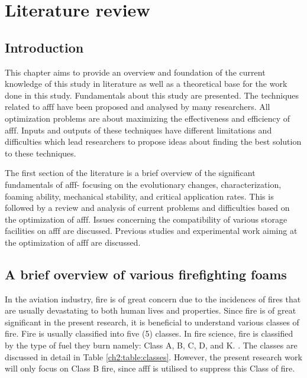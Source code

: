 \chapter{Literature review}
\section{Introduction}
This chapter aims to provide an overview and foundation of the current knowledge of this study in literature as well as a theoretical base for the work done in this study. Fundamentals about this study are presented. The techniques related to \acrshort{afff} have been proposed and analysed by many researchers. All optimization problems are about maximizing the effectiveness and efficiency of \acrshort{afff}. Inputs and outputs of these techniques have different limitations and difficulties which lead researchers to propose ideas about finding the best solution to these techniques.  

The first section of the literature is a brief overview of the significant fundamentals of \acrshort{afff}- focusing on the evolutionary changes, characterization, foaming ability, mechanical stability, and critical application rates. This is followed by a review and analysis of current problems and difficulties based on the optimization of \acrshort{afff}. Issues concerning the compatibility of various storage facilities on \acrshort{afff} are discussed. Previous studies and experimental work aiming at the optimization of \acrshort{afff} are discussed. 

\section{A brief overview of various firefighting foams}
In the aviation industry, fire is of great concern due to the incidences of fires that are usually devastating to both human lives and properties. Since fire is of great significant in the present research, it is beneficial to understand various classes of fire. Fire is usually classified into five (5) classes. In fire science, fire is classified by the type of fuel they burn namely: Class A, B, C, D, and K. \cite{oguike2013study}.  The classes are discussed in detail in Table \ref{ch2:table:classes}. However, the present research work will only focus on Class B fire, since \acrshort{afff} is utilised to suppress this Class of fire.

